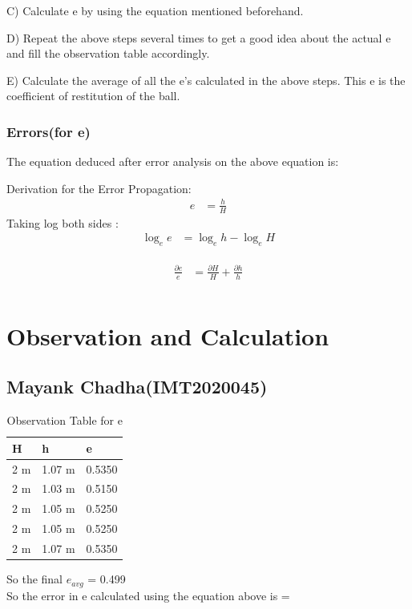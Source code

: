 \documentclass[11pt]{scrartcl} %
\begin{document}
C) Calculate e by using the equation mentioned beforehand. \par

D) Repeat the above steps several times to get a good idea about the actual e and fill the observation table accordingly. \par

E) Calculate the average of all the e’s calculated in the above steps. This e is the coefficient of restitution of the ball. \par

\subsubsection{Errors(for e)}
The equation deduced after error analysis on the above equation is:\par
Derivation for the Error Propagation:
\begin{align} 
		e &= \frac{h}{H} \nonumber
\end{align}
Taking log both sides :
\begin{align}
\log_e e &= \log_e h - \log_e H \nonumber
\end{align}

\begin{align} 
	\begin{split}
		\frac{\partial{e}}{e} &= \frac{\partial{H}}{H} + \frac{\partial{h}}{h}\\
	\end{split}					
\end{align}


\newpage
\section{Observation and Calculation}
\subsection{Mayank Chadha(IMT2020045)}

\begin{table}[h] %
	\centering %
	\begin{tabular}{l l l}
		\toprule
		\textbf{H} & \textbf{h} & \textbf{e} \\
		\midrule
		2 m & 1.07 m & 0.5350\\
        2 m & 1.03 m & 0.5150\\
        2 m & 1.05 m & 0.5250\\
        2 m & 1.05 m & 0.5250 \\
        2 m & 1.07 m & 0.5350 \\
		\bottomrule
	\end{tabular}
	\caption{Observation Table for e}
\end{table}
So the final $e_{avg}$ = 0.499\\
So the error in e calculated using the equation above is =
\end{document}
